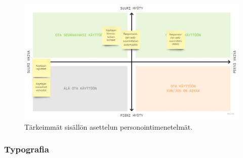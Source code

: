 \documentclass[finnish, 12pt, a4paper, elec, utf8, a-1b, online]{aaltothesis}
\begin{document}
\begin{figure}[htb]
    \centering
    \includegraphics[width=\textwidth]{images/layout-priorization.pdf}
    \caption{Tärkeimmät sisällön asettelun personointimenetelmät.~\label{fig:layout-priorization}}
\end{figure}

\subsubsection{Typografia}
\end{document}
